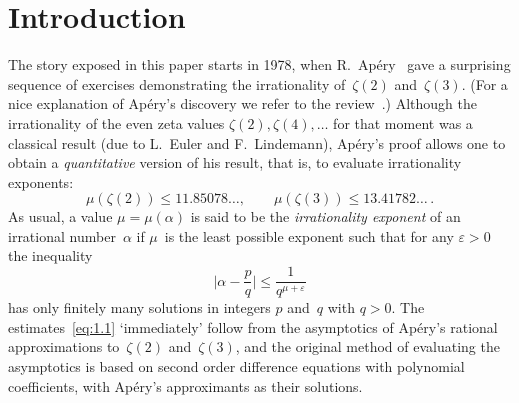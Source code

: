 \documentclass[a4paper,twoside]{article}
\numberwithin{equation}{section}
\renewcommand{\[}{\lfloor}
\renewcommand{\]}{\rfloor}
\newcommand{\<}{\langle}
\renewcommand{\>}{\rangle}
\renewcommand{\epsilon}{\varepsilon}
\begin{document}
\section{Introduction}
\label{sec:1}
The story exposed in this paper starts in 1978, when R.~Ap\'ery~\cite{Ap}
gave a surprising sequence of exercises demonstrating the
irrationality of~$\zeta(2)$ and~$\zeta(3)$. (For a nice explanation
of Ap\'ery's discovery we refer to the review~\cite{Po}.)
Although the irrationality of the even zeta values $\zeta(2),\zeta(4),\dots$
for that moment was a classical result (due to L.~Euler and F.~Lindemann),
Ap\'ery's proof allows one to obtain a {\it quantitative\/} version
of his result, that is, to evaluate irrationality exponents:
\begin{equation}
\mu(\zeta(2))\le11.85078\dots,
\qquad
\mu(\zeta(3))\le13.41782\dots\,.
\label{eq:1.1}
\end{equation}
As usual, a value $\mu=\mu(\alpha)$ is said to be the {\it irrationality
exponent\/} of an irrational number~$\alpha$ if $\mu$~is the least
possible exponent such that for any $\epsilon>0$ the inequality
$$
\biggl|\alpha-\frac pq\biggr|\le\frac1{q^{\mu+\epsilon}}
$$
has only finitely many solutions in integers $p$ and~$q$ with $q>0$.
The estimates~\eqref{eq:1.1} `immediately' follow from the asymptotics
of Ap\'ery's rational approximations to~$\zeta(2)$ and~$\zeta(3)$,
and the original method of evaluating the asymptotics is
based on second order difference equations with polynomial
coefficients, with Ap\'ery's approximants as their solutions.
\end{document}
